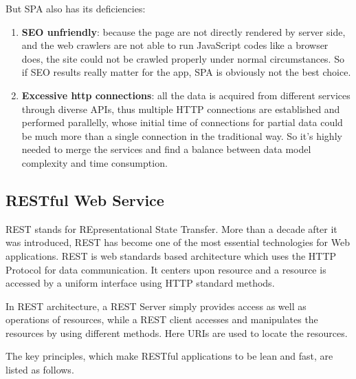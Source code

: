 But SPA also has its deficiencies:

\begin{enumerate}
\item
\textbf{\gls{SEO} unfriendly}: because the page are not directly rendered by server side, and the web crawlers are not able to run JavaScript codes like a browser does, the site could not be crawled properly under normal circumstances. So if SEO results really matter for the app, SPA is obviously not the best choice.
\item
\textbf{Excessive http connections}: all the data is acquired from different services through diverse \gls{API}s, thus multiple HTTP connections are established and performed parallelly, whose initial time of connections for partial data could be much more than a single connection in the traditional way. So it's highly needed to merge the services and find a balance between data model complexity and time consumption.
\end{enumerate}


\subsection{RESTful Web Service}
REST stands for REpresentational State Transfer. More than a decade after it was introduced, REST has become one of the most essential technologies for Web applications\cite{richardson2008restful}. REST is web standards based architecture which uses the HTTP Protocol for data communication. It  centers upon resource  and a resource is accessed by a uniform interface using HTTP standard methods.

In REST architecture, a REST Server simply provides access as well as operations of resources, while a  REST client accesses and manipulates the resources by using different methods. Here URIs are used to locate the resources.


The key principles, which make RESTful applications to be lean and fast, are listed as follows\cite{hamad2010performance}.

